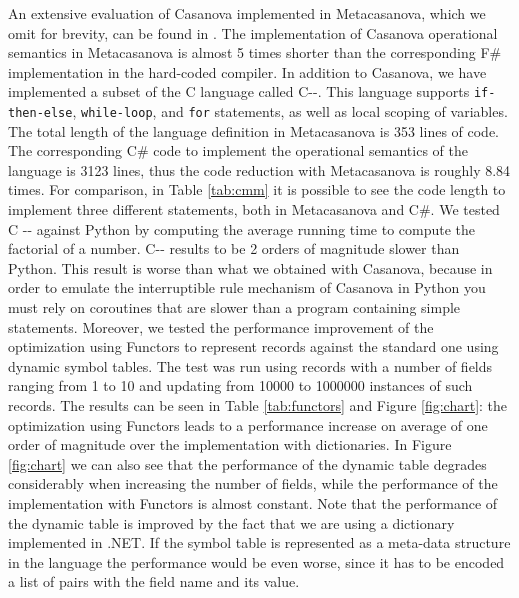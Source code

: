 An extensive evaluation of Casanova implemented in Metacasanova, which we omit for brevity, can be found in \cite{DiGiacomo2017}. The implementation of Casanova operational semantics in Metacasanova is almost 5 times shorter than the corresponding F\# implementation in the hard-coded compiler. In addition to Casanova, we have implemented a subset of the C language called C-{}-. This language supports \texttt{if-then-else}, \texttt{while-loop}, and \texttt{for} statements, as well as local scoping of variables. The total length of the language definition in Metacasanova is 353 lines of code. The corresponding C\# code to implement the operational semantics of the language is 3123 lines, thus the code reduction with Metacasanova is roughly 8.84 times. For comparison, in Table \ref{tab:cmm} it is possible to see the code length to implement three different statements, both in Metacasanova and C\#. We tested C -{}- against Python by computing the average running time to compute the factorial of a number. C-{}- results to be 2 orders of magnitude slower than Python. This result is worse than what we obtained with Casanova, because in order to emulate the interruptible rule mechanism of Casanova in Python you must rely on coroutines that are slower than a program containing simple statements. Moreover, we tested the performance improvement of the optimization using Functors to represent records against the standard one using dynamic symbol tables. The test was run using records with a number of fields ranging from 1 to 10 and updating from 10000 to 1000000 instances of such records. The results can be seen in Table \ref{tab:functors} and Figure \ref{fig:chart}: the optimization using Functors leads to a performance increase on average of one order of magnitude over the implementation with dictionaries. In Figure \ref{fig:chart} we can also see that the performance of the dynamic table degrades considerably when increasing the number of fields, while the performance of the implementation with Functors is almost constant.  Note that the performance of the dynamic table is improved by the fact that we are using a dictionary implemented in .NET. If the symbol table is represented as a meta-data structure in the language the performance would be even worse, since it has to be encoded a list of pairs with the field name and its value.

